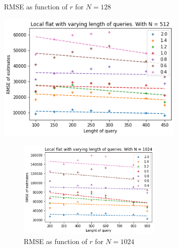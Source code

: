 \documentclass[11pt]{article}
\theoremstyle{definition}
\begin{document}
\begin{figure}[H]
\begin{subfigure}{.4\textwidth}
  \caption{RMSE as function of $r$ for $N=128$}
  \label{fig:a}
\end{subfigure}
\begin{subfigure}{.4\textwidth}
  \centering
  \includegraphics[width=\linewidth]{figures/local_flat/varying_r/loc_flat_varying_length_N_linear_=512.png}
  \caption{RMSE as function of $r$ for $N=512$}
  \label{fig:a}
  \begin{subfigure}{\textwidth}
  \centering
  \includegraphics[width=\linewidth]{figures/local_flat/varying_r/loc_flat_varying_length_N_linear_=1024.png}
  \caption{RMSE as function of $r$ for $N=1024$}
  \label{fig:a}
\end{subfigure}
\begin{subfigure}{\textwidth}
  \centering

\end{subfigure}
\end{subfigure}
\end{figure}
\end{document}

